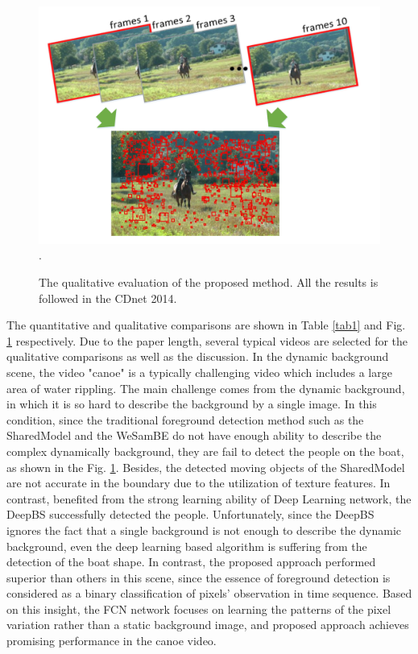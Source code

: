 \documentclass[journal]{IEEEtran}
\newcommand{\reffig}[1]{Fig. \ref{#1}}
\newcommand{\reftab}[1]{Table \ref{#1}}
\begin{document}
\begin{figure}[!t]	\centering
    \includegraphics[width=\textwidth]{figure/fig3}
\DeclareGraphicsExtensions.
    \caption{The qualitative evaluation of the proposed method. All the results is followed in the CDnet 2014.}
    \label{results_chart}
\end{figure}

The quantitative and qualitative comparisons are shown in \reftab{tab1} and  \reffig{results_chart} respectively. 
Due to the paper length, several typical videos are selected for the qualitative comparisons as well as the discussion. 
In the dynamic background scene, the video "canoe" is a typically challenging video which includes a large area of water rippling. 
The main challenge comes from the dynamic background, in which it is so hard to describe the background by a single image. 
In this condition, since the traditional foreground detection method such as the SharedModel and the WeSamBE do not have enough ability to describe the complex dynamically background, they are fail to detect the people on the boat, as shown in the \reffig{results_chart}. 
Besides, the detected moving objects of the SharedModel are not accurate in the boundary due to the utilization of texture features. 
In contrast, benefited from the strong learning ability of Deep Learning network, the DeepBS successfully detected the people. 
Unfortunately, since the DeepBS ignores the fact that a single background is not enough to describe the dynamic background, even the deep learning based algorithm is suffering from the detection of the boat shape. 
In contrast, the proposed approach performed superior than others in this scene, since the essence of foreground detection is considered as a binary classification of pixels' observation in time sequence. 
Based on this insight, the FCN network focuses on learning the patterns of the pixel variation rather than a static background image, and proposed approach achieves promising performance in the canoe video.
\end{document}
